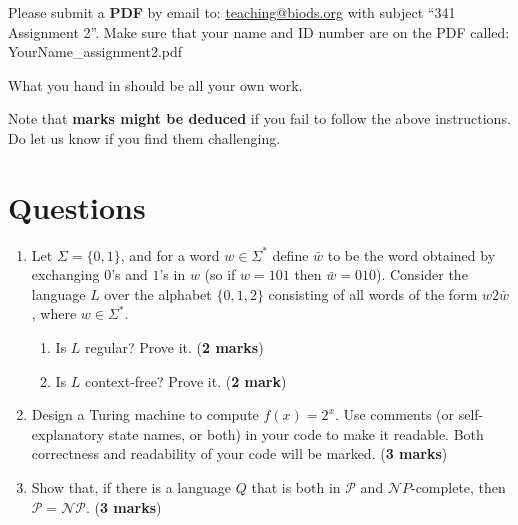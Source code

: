 \documentclass{article}
\begin{document}

Please submit a {\bf PDF} by email to: \href{mailto:teaching@biods.org}{teaching@biods.org} with subject ``341 Assignment 2''.
Make sure that your name and ID number are on the PDF called: YourName\_assignment2.pdf

What you hand in should be all your own work.

Note that \textbf{marks might be deduced} if you fail to follow the above instructions.
Do let us know if you find them challenging.

\section*{Questions}

\begin{enumerate}
\item Let $\Sigma = \{0, 1\}$, and for a word $w \in \Sigma^*$ define $\bar{w}$ to be the word obtained by exchanging $0$'s and $1$'s in $w$ (so if $w = 101$ then $\bar{w} = 010$).
Consider the language $L$ over the alphabet $\{0, 1, 2\}$ consisting of all words of the form $w 2 \bar{w}$, where $w \in
\Sigma^*$.
\begin{enumerate}
\item Is $L$ regular? Prove it. (\textbf{2 marks})
\item Is $L$ context-free? Prove it. (\textbf{2 mark})
\end{enumerate}

\item Design a Turing machine to compute $f(x) = 2^x$.
Use comments (or self-explanatory state names, or both) in your code to make it readable.
Both correctness and readability of your code will be marked. (\textbf{3 marks})

\item Show that, if there is a language $Q$ that is both in $\mathcal P$ and $\mathcal NP$-complete, then $\mathcal P = \mathcal{NP}$. (\textbf{3 marks})
\end{enumerate}
\end{document}
